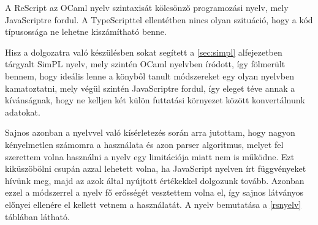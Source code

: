 A ReScript az OCaml nyelv szintaxisát kölcsönző programozási nyelv, mely JavaScriptre fordul. A TypeScripttel ellentétben nincs olyan szituáció, hogy a kód típusossága ne lehetne kiszámítható benne.

Hisz a dolgozatra való készülésben sokat segített a \ref{sec:simpl} alfejezetben tárgyalt SimPL nyelv, mely szintén OCaml nyelvben íródott, így fölmerült bennem, hogy ideális lenne a könyből tanult módszereket egy olyan nyelvben kamatoztatni, mely végül szintén JavaScriptre fordul, így eleget téve annak a kívánságnak, hogy ne kelljen két külön futtatási környezet között konvertálnunk adatokat.

Sajnos azonban a nyelvvel való kísérletezés során arra jutottam, hogy nagyon kényelmetlen számomra a használata és azon parser algoritmus, melyet fel szerettem volna használni a nyelv egy limitációja miatt nem is működne. Ezt kiküszöbölni csupán azzal lehetett volna, ha JavaScript nyelven írt függvényeket hívünk meg, majd az azok által nyújtott értékekkel dolgozunk tovább. Azonban ezzel a módszerrel a nyelv fő erősségét vesztettem volna el, így sajnos látványos előnyei ellenére el kellett vetnem a használatát. A nyelv bemutatása a \ref{rsnyelv} táblában látható.

